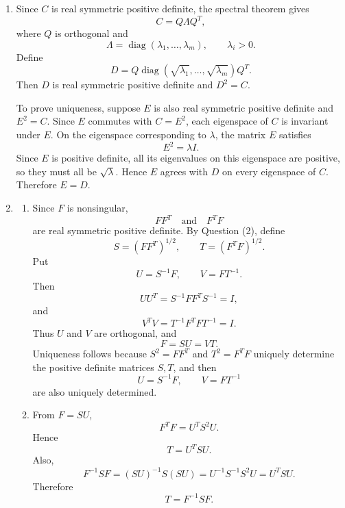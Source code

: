 \documentclass[10pt,a4paper]{article}
\begin{document}
\begin{enumerate}
  \item Since $C$ is real symmetric positive definite, the spectral theorem gives
        \[
          C=Q\Lambda Q^T,
        \]
        where $Q$ is orthogonal and
        \[
          \Lambda=\operatorname{diag}(\lambda_1,\ldots,\lambda_m),
          \qquad
          \lambda_i>0.
        \]
        Define
        \[
          D=Q\operatorname{diag}(\sqrt{\lambda_1},\ldots,\sqrt{\lambda_m})Q^T.
        \]
        Then $D$ is real symmetric positive definite and $D^2=C$.

        To prove uniqueness, suppose $E$ is also real symmetric positive definite and $E^2=C$. Since $E$ commutes with $C=E^2$, each eigenspace of $C$ is invariant under $E$. On the eigenspace corresponding to $\lambda$, the matrix $E$ satisfies
        \[
          E^2=\lambda I.
        \]
        Since $E$ is positive definite, all its eigenvalues on this eigenspace are positive, so they must all be $\sqrt{\lambda}$. Hence $E$ agrees with $D$ on every eigenspace of $C$. Therefore $E=D$.

  \item
        \begin{enumerate}
          \item Since $F$ is nonsingular,
                \[
                  FF^T
                  \quad\text{and}\quad
                  F^TF
                \]
                are real symmetric positive definite. By Question (2), define
                \[
                  S=(FF^T)^{1/2},
                  \qquad
                  T=(F^TF)^{1/2}.
                \]
                Put
                \[
                  U=S^{-1}F,
                  \qquad
                  V=FT^{-1}.
                \]
                Then
                \[
                  UU^T=S^{-1}FF^TS^{-1}=I,
                \]
                and
                \[
                  V^TV=T^{-1}F^TFT^{-1}=I.
                \]
                Thus $U$ and $V$ are orthogonal, and
                \[
                  F=SU=VT.
                \]
                Uniqueness follows because $S^2=FF^T$ and $T^2=F^TF$ uniquely determine the positive definite matrices $S,T$, and then
                \[
                  U=S^{-1}F,\qquad V=FT^{-1}
                \]
                are also uniquely determined.

          \item From $F=SU$,
                \[
                  F^TF=U^TS^2U.
                \]
                Hence
                \[
                  T=U^TSU.
                \]
                Also,
                \[
                  F^{-1}SF
                  =
                  (SU)^{-1}S(SU)
                  =
                  U^{-1}S^{-1}S^2U
                  =
                  U^TSU.
                \]
                Therefore
                \[
                  \boxed{T=F^{-1}SF.}
                \]


\end{enumerate}
\end{enumerate}
\end{document}
